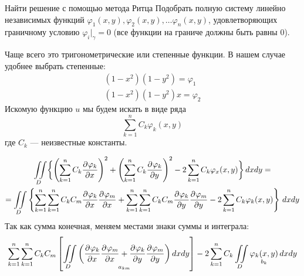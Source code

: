 

\begin{example}{Найти решение с помощью метода Ритца}
Подобрать полную систему линейно независимых функций $\varphi_1(x, y), \varphi_2(x, y), \ldots \varphi_n(x, y)$, удовлетворяющих граничному условию $\varphi_i|_\gamma = 0$ (все функции на граниче должны быть равны $0$).

Чаще всего это тригонометрические или степенные функции. В нашем случае удобнее выбрать степенные: 
\begin{align*}
	(1 - x^2)(1 - y^2) = \varphi_1\\
	(1 - x^2)(1 - y^2)x = \varphi_2
\end{align*}
Искомую функцию $u$ мы будем искать в виде ряда 
\[
	\sum\limits_{k = 1}^n C_k \varphi_k (x, y)
\]
где $C_k$ --- неизвестные константы.

\begin{multline*}
	\iint\limits_D \biggl\{ \left(\sum\limits_{k = 1}^n C_k \frac{\partial^{}\varphi_k}{\partial x^{}} \right)^2 + \left(\sum\limits_{k = 1}^n C_k \frac{\partial^{}\varphi_k}{\partial y^{}} \right)^2 - 2 \sum\limits_{k = 1}^n C_k \varphi_x(x, y) \biggl\}\, dx dy = \\
	= \iint\limits_D \left\{ \sum_{k = 1}^n \sum_{k = 1}^n C_k C_m \frac{\partial^{}\varphi_k}{\partial x^{}} \frac{\partial^{}\varphi_m}{\partial x^{}} + \sum_{k = 1}^n \sum_{k = 1}^n C_k C_m \frac{\partial^{}\varphi_k}{\partial y^{}} \frac{\partial^{}\varphi_m}{\partial y^{}} - 2 \sum\limits_{k = 1}^n C_k \varphi_k (x, y) \right\}\, dx dy
\end{multline*}
Так как сумма конечная, меняем местами знаки суммы и интеграла:
\[
	\sum_{k = 1}^n \sum_{k = 1}^n C_k C_m \left[ \iint\limits_D \underset{a_{km}}{\left(\frac{\partial^{}\varphi_k}{\partial x^{}} \frac{\partial^{}\varphi_m}{\partial x^{}} + \frac{\partial^{}\varphi_k}{\partial y^{}} \frac{\partial^{}\varphi_m}{\partial y^{}} \right)}\, dx dy \right] - 2 \sum\limits_{k = 1}^n C_k \iint\limits_D \underset{b_k}{\varphi_k (x, y)}\, dx dy
\]


\end{example}
